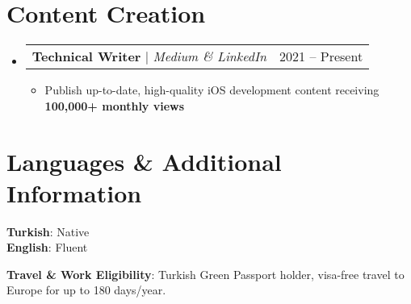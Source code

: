 \documentclass[letterpaper,11pt]{article}
\makeatletter
\newcommand{\resumeItem}[1]{
  \item\small{
    {#1 \vspace{-2pt}}
  }
}
\newcommand{\resumeProjectHeading}[2]{
    \item
    \begin{tabular*}{0.97\textwidth}{l@{\extracolsep{\fill}}r}
      \small#1 & #2 \\
    \end{tabular*}\vspace{-6pt}
}
\newcommand{\resumeSubHeadingListStart}{\begin{itemize}[leftmargin=0.15in, label={}, itemsep=-2pt]}
\newcommand{\resumeSubHeadingListEnd}{\end{itemize}}
\newcommand{\resumeItemListStart}{\begin{itemize}[itemsep=-2pt]}
\newcommand{\resumeItemListEnd}{\end{itemize}\vspace{-4pt}}
\makeatother
\begin{document}
\section{Content Creation}
\vspace{-2pt}
  \resumeSubHeadingListStart
    \resumeProjectHeading
      {\textbf{Technical Writer} $|$ \emph{Medium \& LinkedIn}}{2021 -- Present}
      \resumeItemListStart
        \resumeItem{Publish up-to-date, high-quality iOS development content receiving \textbf{100,000+ monthly views}}
      \resumeItemListEnd
  \resumeSubHeadingListEnd

\section{Languages \& Additional Information}
\vspace{-2pt}
\begin{multicols}{2}
  \begin{minipage}[t]{0.9\columnwidth}
    \vspace{0pt}
    \textbf{Turkish}{: Native}\\
    \textbf{English}{: Fluent}
  \end{minipage}
  
  \columnbreak
  
  \begin{minipage}[t]{0.9\columnwidth}
    \vspace{0pt}
    \textbf{Travel \& Work Eligibility}{: Turkish Green Passport holder, visa-free travel to Europe for up to 180 days/year.}
  \end{minipage}
\end{multicols}
\end{document}
